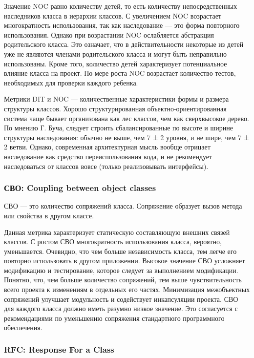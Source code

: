 \documentclass{../../text-style}
\begin{document}
Значение NOC равно количеству детей, то есть количеству непосредственных наследников класса в иерархии классов. С увеличением NOC возрастает многократность использования, так как наследование --- это форма повторного использования. Однако при возрастании NOC ослабляется абстракция родительского класса. Это означает, что в действительности некоторые из детей уже не являются членами родительского класса и могут быть неправильно использованы. Кроме того, количество детей характеризует потенциальное влияние класса на проект. По мере роста NOC возрастает количество тестов, необходимых для проверки каждого ребенка.

Метрики DIT и NOC --- количественные характеристики формы и размера структуры классов. Хорошо структурированная объектно-ориентированная система чаще бывает организована как лес классов, чем как сверхвысокое дерево. По мнению Г. Буча, следует строить сбалансированные по высоте и ширине структуры наследования: обычно не выше, чем 7 ± 2 уровня, и не шире, чем 7 ± 2 ветви. Однако, современная архитектурная мысль вообще отрицает наследование как средство переиспользования кода, и не рекомендует наследоваться от классов вовсе (только реализовывать интерфейсы).

\subsubsection{СВО: Coupling between object classes}

СВО --- это количество сопряжений класса. Сопряжение образует вызов метода или свойства в другом классе.

Данная метрика характеризует статическую составляющую внешних связей классов. С ростом СВО многократность использования класса, вероятно, уменьшается. Очевидно, что чем больше независимость класса, тем легче его повторно использовать в другом приложении. Высокое значение СВО усложняет модификацию и тестирование, которое следует за выполнением модификации. Понятно, что, чем больше количество сопряжений, тем выше чувствительность всего проекта к изменениям в отдельных его частях. Минимизация межобъектных сопряжений улучшает модульность и содействует инкапсуляции проекта.
СВО для каждого класса должно иметь разумно низкое значение. Это согласуется с рекомендациями по уменьшению сопряжения стандартного программного обеспечения.

\subsubsection{RFC: Response For a Class}
\end{document}
